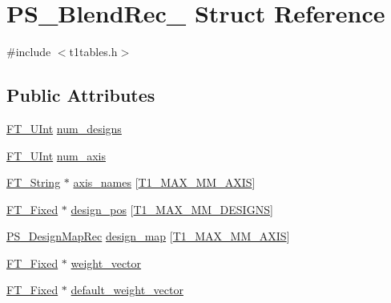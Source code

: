 \hypertarget{struct_p_s___blend_rec__}{}\section{P\+S\+\_\+\+Blend\+Rec\+\_\+ Struct Reference}
\label{struct_p_s___blend_rec__}


{\ttfamily \#include $<$t1tables.\+h$>$}

\subsection*{Public Attributes}
\begin{DoxyCompactItemize}
\item 
\mbox{\hyperlink{fttypes_8h_abcb8db4dbf35d2b55a9e8c7b0926dc52}{F\+T\+\_\+\+U\+Int}} \mbox{\hyperlink{struct_p_s___blend_rec___ad81cbf3697f89908e9c15071e2ab9cac}{num\+\_\+designs}}
\item 
\mbox{\hyperlink{fttypes_8h_abcb8db4dbf35d2b55a9e8c7b0926dc52}{F\+T\+\_\+\+U\+Int}} \mbox{\hyperlink{struct_p_s___blend_rec___af9b375493ee2d450cabbc571473e4006}{num\+\_\+axis}}
\item 
\mbox{\hyperlink{fttypes_8h_a9846214585359eb2ba6bbb0e6de30639}{F\+T\+\_\+\+String}} $\ast$ \mbox{\hyperlink{struct_p_s___blend_rec___afc0e4018ff3439f306d61e3c219b91f9}{axis\+\_\+names}} \mbox{[}\mbox{\hyperlink{t1tables_8h_a471108ae668a65363dd36bb17e1ecbbe}{T1\+\_\+\+M\+A\+X\+\_\+\+M\+M\+\_\+\+A\+X\+IS}}\mbox{]}
\item 
\mbox{\hyperlink{fttypes_8h_a5f5a679cc09f758efdd0d1c5feed3c3d}{F\+T\+\_\+\+Fixed}} $\ast$ \mbox{\hyperlink{struct_p_s___blend_rec___ad0e6c9b9d42346fd8a3371a5b2473e3c}{design\+\_\+pos}} \mbox{[}\mbox{\hyperlink{t1tables_8h_a933ca229674aa312fd5546fadc95e08f}{T1\+\_\+\+M\+A\+X\+\_\+\+M\+M\+\_\+\+D\+E\+S\+I\+G\+NS}}\mbox{]}
\item 
\mbox{\hyperlink{t1tables_8h_a94de6b0634fcae90953c7427cdb28eee}{P\+S\+\_\+\+Design\+Map\+Rec}} \mbox{\hyperlink{struct_p_s___blend_rec___a005c783c65e5dd35611e88901b5db2ca}{design\+\_\+map}} \mbox{[}\mbox{\hyperlink{t1tables_8h_a471108ae668a65363dd36bb17e1ecbbe}{T1\+\_\+\+M\+A\+X\+\_\+\+M\+M\+\_\+\+A\+X\+IS}}\mbox{]}
\item 
\mbox{\hyperlink{fttypes_8h_a5f5a679cc09f758efdd0d1c5feed3c3d}{F\+T\+\_\+\+Fixed}} $\ast$ \mbox{\hyperlink{struct_p_s___blend_rec___ae3dcbb2aaee676fdc3d5bde890b2cc78}{weight\+\_\+vector}}
\item 
\mbox{\hyperlink{fttypes_8h_a5f5a679cc09f758efdd0d1c5feed3c3d}{F\+T\+\_\+\+Fixed}} $\ast$ \mbox{\hyperlink{struct_p_s___blend_rec___a29c19d988e8ee1eb4f333b1ac55759de}{default\+\_\+weight\+\_\+vector}}

\end{DoxyCompactItemize}

